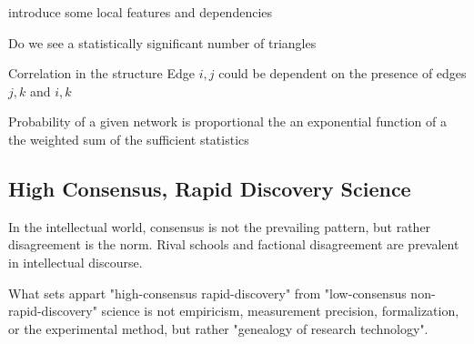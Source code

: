 introduce some local features and dependencies

Do we see a statistically significant number of triangles

Correlation in the structure
Edge $i,j$ could be dependent on the presence of edges $j,k$ and $i,k$

Probability of a given network is proportional the an exponential function of a the weighted sum of the sufficient statistics

\subsection{High Consensus, Rapid Discovery Science}

In the intellectual world, consensus is not the prevailing pattern, but rather disagreement is the norm. Rival schools and factional disagreement are prevalent in intellectual discourse.

What sets appart "high-consensus rapid-discovery" from "low-consensus non-rapid-discovery" science is not empiricism, measurement precision, formalization, or the experimental method, but rather "genealogy of research technology".

\cite{latour1988}

\cite{kuhn2012}

\cite{mullins1973}

\cite{abbott2001}







